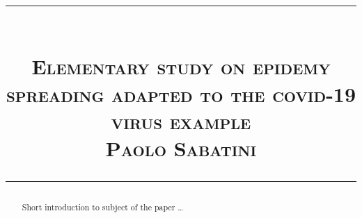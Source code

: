 \documentclass{article}
\title{
\begin{flushleft}
\rule{16cm}{1pt}\\
  \textsc{\textbf{Elementary study on epidemy spreading adapted to the covid-19 virus example 	}}\\[2mm]
\textsc{\large Paolo Sabatini}\\
\rule{16cm}{1pt}
  \end{flushleft}
}
\date{}
\begin{document}
\maketitle


\begin{abstract}
Short introduction to subject of the paper \ldots 
\end{abstract}
\end{document}
